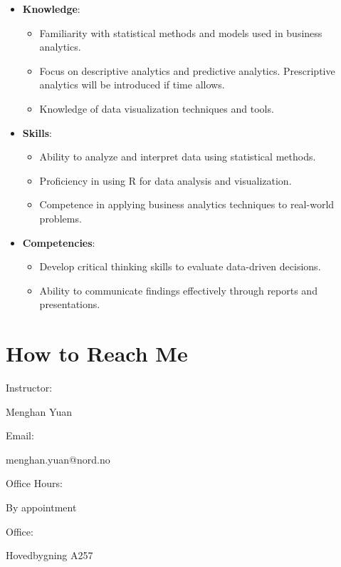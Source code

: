 \documentclass[
  12pt,
  letterpaper,
]{scrbook}
\providecommand{\tightlist}{%
  \setlength{\itemsep}{0pt}\setlength{\parskip}{0pt}}
\renewcommand{\tightlist}{\setlength{\itemsep}{0.5\baselineskip}\setlength{\parskip}{0.2\baselineskip}}
\theoremstyle{plain}
\theoremstyle{definition}
\theoremstyle{remark}
\begin{document}
\begin{itemize}
\tightlist
\item
  \textbf{Knowledge}:

  \begin{itemize}
  \tightlist
  \item
    Familiarity with statistical methods and models used in business
    analytics.
  \item
    Focus on descriptive analytics and predictive analytics.
    Prescriptive analytics will be introduced if time allows.
  \item
    Knowledge of data visualization techniques and tools.
  \end{itemize}
\item
  \textbf{Skills}:

  \begin{itemize}
  \tightlist
  \item
    Ability to analyze and interpret data using statistical methods.
  \item
    Proficiency in using R for data analysis and visualization.
  \item
    Competence in applying business analytics techniques to real-world
    problems.
  \end{itemize}
\item
  \textbf{Competencies}:

  \begin{itemize}
  \tightlist
  \item
    Develop critical thinking skills to evaluate data-driven decisions.
  \item
    Ability to communicate findings effectively through reports and
    presentations.
  \end{itemize}
\end{itemize}

\section{How to Reach Me}\label{how-to-reach-me}

Instructor:

Menghan Yuan

Email:

menghan.yuan@nord.no

Office Hours:

By appointment

Office:

Hovedbygning A257

~
\end{document}
